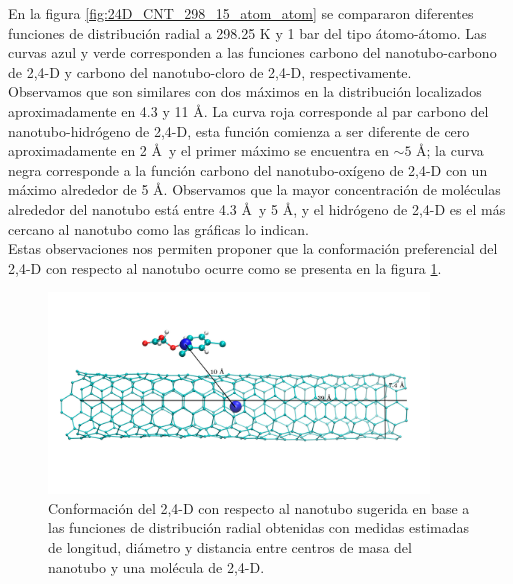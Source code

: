\newpage

En la figura \ref{fig:24D_CNT_298_15_atom_atom} se compararon diferentes funciones de distribución radial a 298.25 K y 1 bar del tipo átomo-átomo. Las curvas azul y verde corresponden a las funciones carbono del nanotubo-carbono de 2,4-D y carbono del nanotubo-cloro de 2,4-D, respectivamente. \\

Observamos que son similares con dos máximos en la distribución localizados aproximadamente en 4.3 y 11 \AA. La curva roja corresponde al par carbono del nanotubo-hidrógeno de 2,4-D, esta función comienza a ser diferente de cero aproximadamente en 2 \AA\  y el primer máximo se encuentra en $\sim 5$ \AA; la curva negra corresponde a la función carbono del nanotubo-oxígeno de 2,4-D con un máximo alrededor de 5 \AA. Observamos que la mayor concentración de moléculas alrededor del nanotubo está entre 4.3 \AA\  y 5 \AA, y el hidrógeno de 2,4-D es el más cercano al nanotubo como las gráficas lo indican.\\

Estas observaciones nos permiten proponer que la conformación preferencial del 2,4-D con respecto al nanotubo ocurre como se presenta en la figura \ref{fig:figura-resultados-rdf}.\\

\begin{figure}[!hbt]
    \centering
    \includegraphics[width=0.9\textwidth,keepaspectratio=true]{resultados/figura-resultados-rdf.png}
    \caption{Conformación del 2,4-D con respecto al nanotubo sugerida en base a las funciones de distribución radial obtenidas con medidas estimadas de longitud, diámetro y distancia entre centros de masa del nanotubo y una molécula de 2,4-D.}
    \label{fig:figura-resultados-rdf}
\end{figure}

\newpage

